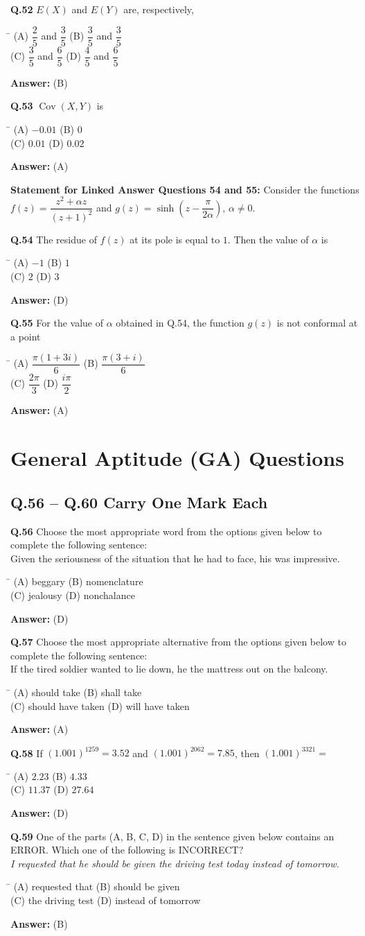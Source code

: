 \documentclass[11pt,a4paper]{article}
\newcommand{\optsfourA}[4]{%
  \begin{tabbing}
    \hspace{0.48\linewidth}\=\kill
    (A) #1 \> (B) #2 \\[2pt]
    (C) #3 \> (D) #4
  \end{tabbing}%
}
\newcommand{\ans}[1]{\textbf{Answer:} #1\par\medskip}
\begin{document}
\textbf{Q.52} $E(X)$ and $E(Y)$ are, respectively,
\optsfourA{$\dfrac{2}{5}$ and $\dfrac{3}{5}$}{$\dfrac{3}{5}$ and $\dfrac{3}{5}$}{$\dfrac{3}{5}$ and $\dfrac{6}{5}$}{$\dfrac{4}{5}$ and $\dfrac{6}{5}$}
\ans{(B)}

\textbf{Q.53} $\operatorname{Cov}(X, Y)$ is
\optsfourA{$-0.01$}{$0$}{$0.01$}{$0.02$}
\ans{(A)}

\medskip
\textbf{Statement for Linked Answer Questions 54 and 55:}
Consider the functions $f(z) = \dfrac{z^2 + \alpha z}{(z + 1)^2}$ and $g(z) = \sinh\!\left(z - \dfrac{\pi}{2\alpha}\right)$, $\alpha \ne 0$.

\textbf{Q.54} The residue of $f(z)$ at its pole is equal to $1$. Then the value of $\alpha$ is
\optsfourA{$-1$}{$1$}{$2$}{$3$}
\ans{(D)}

\textbf{Q.55} For the value of $\alpha$ obtained in Q.54, the function $g(z)$ is not conformal at a point
\optsfourA{$\dfrac{\pi(1 + 3i)}{6}$}{$\dfrac{\pi(3 + i)}{6}$}{$\dfrac{2\pi}{3}$}{$\dfrac{i\pi}{2}$}
\ans{(A)}

\section*{General Aptitude (GA) Questions}

\subsection*{Q.56 -- Q.60 Carry One Mark Each}

\textbf{Q.56} Choose the most appropriate word from the options given below to complete the following sentence:\\
Given the seriousness of the situation that he had to face, his \underline{\hspace{2cm}} was impressive.
\optsfourA{beggary}{nomenclature}{jealousy}{nonchalance}
\ans{(D)}

\textbf{Q.57} Choose the most appropriate alternative from the options given below to complete the following sentence:\\
If the tired soldier wanted to lie down, he \underline{\hspace{2cm}} the mattress out on the balcony.
\optsfourA{should take}{shall take}{should have taken}{will have taken}
\ans{(A)}

\textbf{Q.58} If $(1.001)^{1259} = 3.52$ and $(1.001)^{2062} = 7.85$, then $(1.001)^{3321} =$
\optsfourA{$2.23$}{$4.33$}{$11.37$}{$27.64$}
\ans{(D)}

\textbf{Q.59} One of the parts (A, B, C, D) in the sentence given below contains an ERROR. Which one of the following is INCORRECT?\\
\textit{I requested that he should be given the driving test today instead of tomorrow.}
\optsfourA{requested that}{should be given}{the driving test}{instead of tomorrow}
\ans{(B)}
\end{document}
